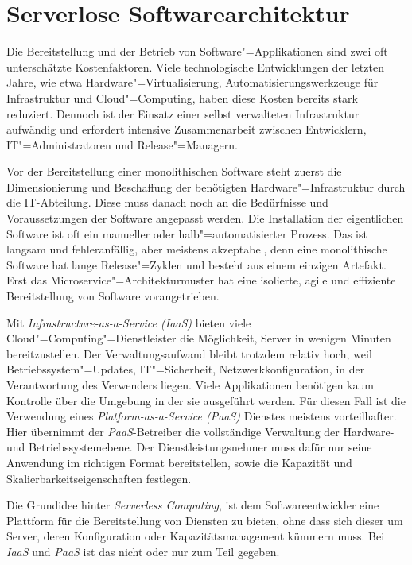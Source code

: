 \chapter{Serverlose Softwarearchitektur}

Die Bereitstellung und der Betrieb von Software"=Applikationen sind zwei oft unterschätzte Kostenfaktoren. Viele technologische Entwicklungen der letzten Jahre, wie etwa Hardware"=Virtualisierung, Automatisierungswerkzeuge für Infrastruktur und Cloud"=Computing, haben diese Kosten bereits stark reduziert. Dennoch ist der Einsatz einer selbst verwalteten Infrastruktur aufwändig und erfordert intensive Zusammenarbeit zwischen Entwicklern, IT"=Administratoren und Release"=Managern.

Vor der Bereitstellung einer monolithischen Software steht zuerst die Dimensionierung und Beschaffung der benötigten Hardware"=Infrastruktur durch die IT-Abteilung. Diese muss danach noch an die Bedürfnisse und Voraussetzungen der Software angepasst werden. Die Installation der eigentlichen Software ist oft ein manueller oder halb"=automatisierter Prozess. Das ist langsam und fehleranfällig, aber meistens akzeptabel, denn eine monolithische Software hat lange Release"=Zyklen und besteht aus einem einzigen Artefakt. Erst das Microservice"=Architekturmuster hat eine isolierte, agile und effiziente Bereitstellung von Software vorangetrieben.

Mit \textit{Infrastructure-as-a-Service (IaaS)} bieten viele Cloud"=Computing"=Dienstleister die Möglichkeit, Server in wenigen Minuten bereitzustellen. Der Verwaltungsaufwand bleibt trotzdem relativ hoch, weil Betriebssystem"=Updates, IT"=Sicherheit, Netzwerkkonfiguration, \usw in der Verantwortung des Verwenders liegen. Viele Applikationen benötigen kaum Kontrolle über die Umgebung in der sie ausgeführt werden. Für diesen Fall ist die Verwendung eines \textit{Platform-as-a-Service (PaaS)} Dienstes meistens vorteilhafter. Hier übernimmt der \textit{PaaS}-Betreiber die vollständige Verwaltung der Hardware- und Betriebssystemebene. Der Dienstleistungsnehmer muss dafür nur seine Anwendung im richtigen Format bereitstellen, sowie die Kapazität und Skalierbarkeitseigenschaften festlegen.

Die Grundidee hinter \textit{Serverless Computing}, ist dem Softwareentwickler eine Plattform für die Bereitstellung von Diensten zu bieten, ohne dass sich dieser um Server, deren Konfiguration oder Kapazitätsmanagement kümmern muss. Bei \textit{IaaS} und \textit{PaaS} ist das nicht oder nur zum Teil gegeben.

